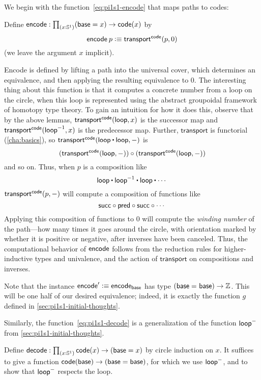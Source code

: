 %
We begin with the function~\eqref{eq:pi1s1-encode} that maps paths to codes:
\begin{defn}
Define $\encode : \prd{x : \Sn ^1} (\base=x) \rightarrow  \code(x)$ by 
\[
\mathsf{encode} \: p \vcentcolon\equiv \mathsf{transport}^{\mathsf{code}}(p,0)
\]
(we leave the argument $x$ implicit).  
\end{defn}
Encode is defined by lifting a path into the universal cover, which
determines an equivalence, and then applying the resulting equivalence
to $0$.  
The interesting thing about this function is that it computes a concrete
number from a loop on the circle, when this loop is represented using
the abstract groupoidal framework of homotopy type theory.  To gain an
intuition for how it does this, observe that by the above lemmas,
$\mathsf{transport}^{\mathsf{code}}(\mathsf{loop},x)$ is the successor map and $\mathsf{transport}^{\mathsf{code}}(\mathord{{\mathsf{loop}}^{-1}},x)$ is the predecessor map.
Further, $\mathsf{transport}$ is functorial (\autoref{cha:basics}), so
$\transfib{\code} {\lloop \ct \lloop}{-}$ is
\[(\mathsf{transport}^{\mathsf{code}}(\mathsf{loop},-)) \circ (\mathsf{transport}^{\mathsf{code}}(\mathsf{loop},-))\]
and so on.
Thus, when $p$ is a composition like 
\[
\lloop \ct \opp \lloop \ct \lloop \ct \cdots
\]
$\mathsf{transport}^{\mathsf{code}}(p,-)$ will compute a composition of functions like
\[
\mathsf{succ} \circ \mathsf{pred} \circ \mathsf{succ} \circ \cdots 
\]
Applying this composition of functions to 0 will compute the
%
\emph{winding number} of the path---how many times it goes around the
circle, with orientation marked by whether it is positive or negative,
after inverses have been canceled.  Thus, the computational behavior of
$\mathsf{encode}$ follows from the reduction rules for higher-inductive types and
univalence, and the action of $\mathsf{transport}$ on compositions and inverses.

Note that the instance $\mathsf{encode}' \vcentcolon\equiv \mathsf{encode}_{\mathsf{base}}$ has type 
$(\mathsf{base} =_{} \mathsf{base}) \rightarrow \mathbb{Z}$.
This will be one half of our desired equivalence; indeed, it is exactly the function $g$ defined in \autoref{sec:pi1s1-initial-thoughts}.

Similarly, the function~\eqref{eq:pi1s1-decode} is a generalization of the function $\mathsf{loop}^-$ from \autoref{sec:pi1s1-initial-thoughts}.

\begin{defn}\label{thm:pi1s1-decode}
Define $\decode : \prd{x : \Sn ^1}\code(x) \rightarrow (\base=x)$ by 
circle induction on $x$.  It suffices to give a function 
${\mathsf{code}(\mathsf{base}) \rightarrow (\mathsf{base}=\mathsf{base})}$, for which we use $\mathsf{loop}^-$, and 
to show that $\mathsf{loop}^-$ respects the loop.  
\end{defn}

